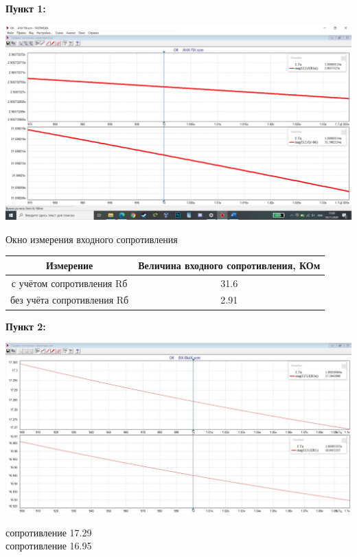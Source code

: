 \documentclass[a4paper,14pt]{extarticle}
\begin{document}
    \textbf{Пункт 1:}
    \begin{center}
        \includegraphics[scale=0.25]{1.jpg}
    \end{center}
    Окно измерения входного сопротивления 

    \begin{tabular}{ |c|c| }
        \hline
        Измерение & Величина входного сопротивления, КОм\\
        \hline
        с учётом сопротивления Rб & 31.6\\
        \hline
        без учёта сопротивления Rб & 2.91\\
        \hline
    \end{tabular}

    \newpage
    \textbf{Пункт 2:}
    \begin{center}
        \includegraphics[scale=0.25]{2.jpg}
    \end{center}
    сопротивление 17.29\\
    сопротивление 16.95\\
\end{document}
